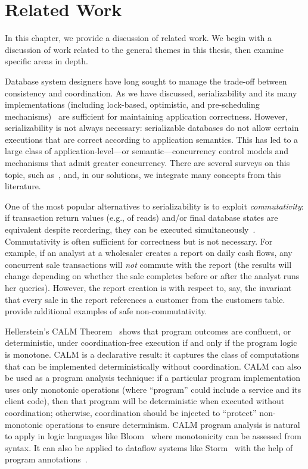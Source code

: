 
\chapter{Related Work}
\label{c.relatedwork}

In this chapter, we provide a discussion of related work. We begin
with a discussion of work related to the general themes in this
thesis, then examine specific areas in depth.


Database system designers have long sought to manage the trade-off
between consistency and coordination. As we have discussed,
serializability and its many implementations (including lock-based,
optimistic, and pre-scheduling
mechanisms)~\cite{silo,bernstein-book,tamer-book,hstore,gray-virtues,calvin,eswaran-consistency,sdd1}
are sufficient for maintaining application correctness. However,
serializability is not always necessary: serializable databases do not allow certain
executions that are correct according to application semantics.  This
has led to a large class of application-level---or
semantic---concurrency control models and mechanisms that admit
greater concurrency. There are several surveys on this topic, such
as~\cite{tamer-book,ic-survey}, and, in our solutions, we integrate
many concepts from this literature.

 One of the most popular alternatives to
serializability is to exploit \textit{commutativity}: if transaction
return values (e.g., of reads) and/or final database states are
equivalent despite reordering, they can be executed
simultaneously~\cite{weihl-thesis,kohler-commutativity,redblue}. Commutativity
is often sufficient for correctness but is not necessary. For example,
if an analyst at a wholesaler creates a report on daily cash flows,
any concurrent sale transactions will \textit{not} commute with the
report (the results will change depending on whether the sale
completes before or after the analyst runs her queries). However, the
report creation is \iconfluent with respect to, say, the invariant
that every sale in the report references a customer from the customers
table. \cite{kohler-commutativity,lamport-audit} provide additional
examples of safe non-commutativity.

Hellerstein's CALM Theorem~\cite{ameloot-calm} shows that program
outcomes are confluent, or deterministic, under coordination-free
execution if and only if the program logic is monotone. CALM is a
declarative result: it captures the class of computations that can be
implemented deterministically without coordination. CALM can also be
used as a program analysis technique: if a particular program
implementation uses only monotonic operations (where ``program'' could
include a service and its client code), then that program will be
deterministic when executed without coordination; otherwise,
coordination should be injected to ``protect'' non-monotonic
operations to ensure determinism.  CALM program analysis is natural to
apply in logic languages like Bloom~\cite{calm} where monotonicity can
be assessed from syntax.  It can also be applied to dataflow systems
like Storm~\cite{storm} with the help of program
annotations~\cite{blazes}.

